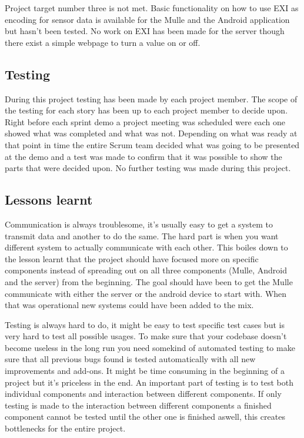 Project target number three is not met.
Basic functionality on how to use EXI as encoding for sensor data is available for the Mulle and the Android application but hasn't been tested.
No work on EXI has been made for the server though there exist a simple webpage to turn a value on or off.

\subsection{Testing}
During this project testing has been made by each project member.
The scope of the testing for each story has been up to each project member to decide upon.
Right before each sprint demo a project meeting was scheduled were each one showed what was completed and what was not.
Depending on what was ready at that point in time the entire Scrum team decided what was going to be presented at the demo and a test was made to confirm that it was possible to show the parts that were decided upon.
No further testing was made during this project.
\subsection{Lessons learnt}
Communication is always troublesome, it's usually easy to get a system to transmit data and another to do the same.
The hard part is when you want different system to actually communicate with each other.
This boiles down to the lesson learnt that the project should have focused more on specific components instead of spreading out on all three components (Mulle, Android and the server) from the beginning.
The goal should have been to get the Mulle communicate with either the server or the android device to start with.
When that was operational new systems could have been added to the mix.

Testing is always hard to do, it might be easy to test specific test cases but is very hard to test all possible usages.
To make sure that your codebase doesn't become useless in the long run you need somekind of automated testing to make sure that all previous bugs found is tested automatically with all new improvements and add-ons.
It might be time consuming in the beginning of a project but it's priceless in the end.
An important part of testing is to test both individual components and interaction between different components.
If only testing is made to the interaction between different components a finished component cannot be tested until the other one is finished aswell, this creates bottlenecks for the entire project.

